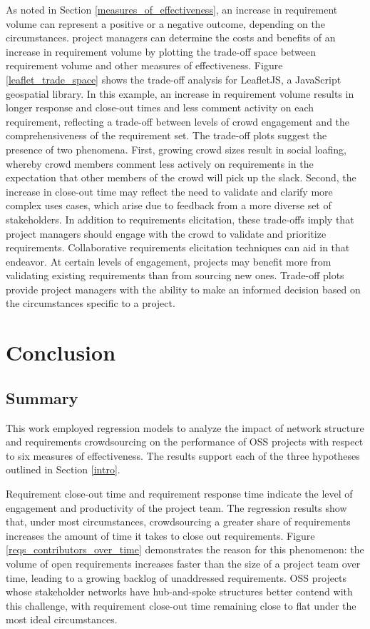 As noted in Section \ref{measures_of_effectiveness}, an increase in requirement volume can represent a positive or a negative outcome, depending on the circumstances. project managers can determine the costs and benefits of an increase in requirement volume by plotting the trade-off space between requirement volume and other measures of effectiveness. Figure \ref{leaflet_trade_space} shows the trade-off analysis for LeafletJS, a JavaScript geospatial library. In this example, an increase in requirement volume results in longer response and close-out times and less comment activity on each requirement, reflecting a trade-off between levels of crowd engagement and the comprehensiveness of the requirement set. The trade-off plots suggest the presence of two phenomena. First, growing crowd sizes result in social loafing, whereby crowd members comment less actively on requirements in the expectation that other members of the crowd will pick up the slack. Second, the increase in close-out time may reflect the need to validate and clarify more complex uses cases, which arise due to feedback from a more diverse set of stakeholders. In addition to requirements elicitation, these trade-offs imply that project managers should engage with the crowd to validate and prioritize requirements. Collaborative requirements elicitation techniques \cite{stakerare, mobasher} can aid in that endeavor. At certain levels of engagement, projects may benefit more from validating existing requirements than from sourcing new ones. Trade-off plots provide project managers with the ability to make an informed decision based on the circumstances specific to a project.

\section{Conclusion}

\subsection{Summary}

This work employed regression models to analyze the impact of network structure and requirements crowdsourcing on the performance of OSS projects with respect to six measures of effectiveness. The results support each of the three hypotheses outlined in Section \ref{intro}.

Requirement close-out time and requirement response time indicate the level of engagement and productivity of the project team. The regression results show that, under most circumstances, crowdsourcing a greater share of requirements increases the amount of time it takes to close out requirements. Figure \ref{reqs_contributors_over_time} demonstrates the reason for this phenomenon: the volume of open requirements increases faster than the size of a project team over time, leading to a growing backlog of unaddressed requirements. OSS projects whose stakeholder networks have hub-and-spoke structures better contend with this challenge, with requirement close-out time remaining close to flat under the most ideal circumstances.

